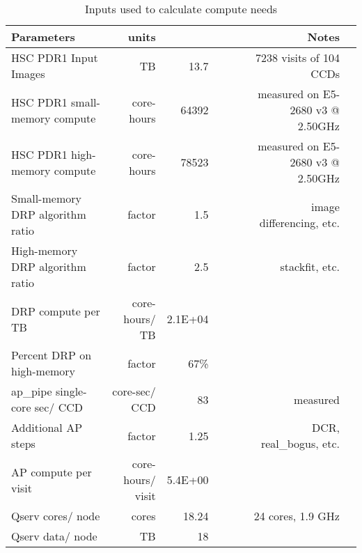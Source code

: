 \tiny \begin{longtable} { |p{}  |r  |r  |r  |r  |r  |r  |r |} 
\caption{Inputs used to calculate compute needs \label{tab:computeSizing}}\\ 
\hline 
\textbf{Parameters}&\textbf{units}&\textbf{}&\textbf{}&\textbf{}&\textbf{}&\textbf{Notes} \\ \hline
{HSC PDR1 Input Images}&{TB}&{13.7}&{}&{}&{}&{7238 visits of 104 CCDs} \\ \hline
{HSC PDR1 small-memory compute}&{core-hours}&{64392}&{}&{}&{}&{measured on E5-2680 v3 @ 2.50GHz} \\ \hline
{HSC PDR1 high-memory compute}&{core-hours}&{78523}&{}&{}&{}&{measured on E5-2680 v3 @ 2.50GHz} \\ \hline
{Small-memory DRP algorithm ratio}&{factor}&{1.5}&{}&{}&{}&{image differencing, etc.} \\ \hline
{High-memory DRP algorithm ratio}&{factor}&{2.5}&{}&{}&{}&{stackfit, etc.} \\ \hline
{DRP compute per TB}&{core-hours/ TB}&{2.1E+04}&&&& \\ \hline
{Percent DRP on high-memory}&{factor}&{67\%}&&&& \\ \hline
{ap\_pipe single-core sec/ CCD}&{core-sec/ CCD}&{83}&{}&{}&{}&{measured} \\ \hline
{Additional AP steps}&{factor}&{1.25}&{}&{}&{}&{DCR, real\_bogus, etc.} \\ \hline
{AP compute per visit}&{core-hours/ visit}&{5.4E+00}&&&& \\ \hline
{Qserv cores/ node}&{cores}&{18.24}&{}&{}&{}&{24 cores, 1.9 GHz} \\ \hline
{Qserv data/ node}&{TB}&{18}&&&& \\ \hline
\end{longtable} \normalsize
